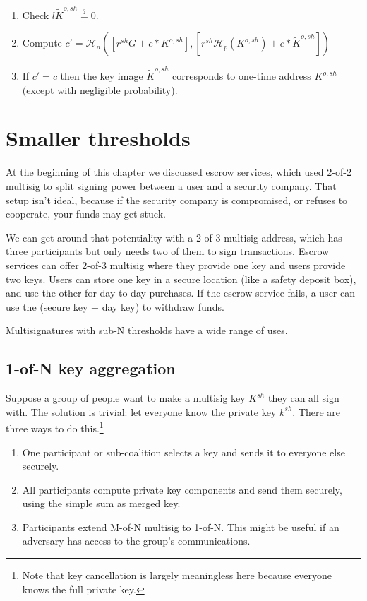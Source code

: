 \begin{enumerate}
    \item Check $l \tilde{K}^{o,sh} \stackrel{?}{=} 0$.
    \item Compute $c' = \mathcal{H}_n([r^{sh} G + c*K^{o,sh}],[r^{sh} \mathcal{H}_p(K^{o,sh}) + c*\tilde{K}^{o,sh}])$
    \item If $c' = c$ then the key image $\tilde{K}^{o,sh}$ corresponds to one-time address $K^{o,sh}$ (except with negligible probability).
\end{enumerate}



    
\section{Smaller thresholds}
\label{sec:smaller-thresholds}

At the beginning of this chapter we discussed escrow services, which used 2-of-2 multisig to split signing power between a user and a security company. That setup isn't ideal, because if the security company is compromised, or refuses to cooperate, your funds may get stuck.

We can get around that potentiality with a 2-of-3 multisig address, which has three participants but only needs two of them to sign transactions. Escrow services can offer 2-of-3 multisig where they provide one key and users provide two keys. Users can store one key in a secure location (like a safety deposit box), and use the other for day-to-day purchases. If the escrow service fails, a user can use the (secure key + day key) to withdraw funds.

Multisignatures with sub-N thresholds have a wide range of uses.


\subsection{1-of-N key aggregation}
\label{sec:1-of-n}

Suppose a group of people want to make a multisig key $K^{sh}$ they can all sign with. The solution is trivial: let everyone know the private key $k^{sh}$. There are three ways to do this.\footnote{Note that key cancellation is largely meaningless here because everyone knows the full private key.}

\begin{enumerate}
    \item One participant or sub-coalition selects a key and sends it to everyone else securely.
    \item All participants compute private key components and send them securely, using the simple sum as merged key.
    \item Participants extend M-of-N multisig to 1-of-N. This might be useful if an adversary has access to the group's communications.
\end{enumerate}

